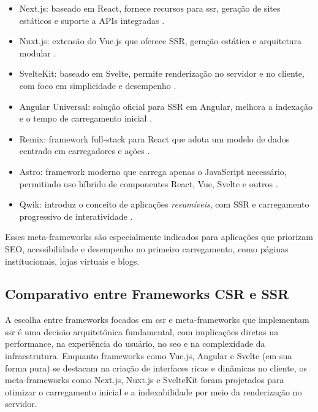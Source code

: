 \begin{itemize}
    \item Next.js: baseado em React, fornece recursos para \acrshort{ssr}, geração de sites estáticos e suporte a APIs integradas \cite{nextjs2024}.
    
    \item Nuxt.js: extensão do Vue.js que oferece SSR, geração estática e arquitetura modular \cite{nuxtjs2024}.
    
    \item SvelteKit: baseado em Svelte, permite renderização no servidor e no cliente, com foco em simplicidade e desempenho \cite{sveltekit2024}.
    
    \item Angular Universal: solução oficial para SSR em Angular, melhora a indexação e o tempo de carregamento inicial \cite{angularuniversal2024}.
    
    \item Remix: framework full-stack para React que adota um modelo de dados centrado em carregadores e ações \cite{remix2024}.
    
    \item Astro: framework moderno que carrega apenas o JavaScript necessário, permitindo uso híbrido de componentes React, Vue, Svelte e outros \cite{astro2024}.
    
    \item Qwik: introduz o conceito de aplicações \textit{resumíveis}, com SSR e carregamento progressivo de interatividade \cite{qwik2024}.
\end{itemize}

Esses meta-frameworks são especialmente indicados para aplicações que priorizam SEO, acessibilidade e desempenho no primeiro carregamento, como páginas institucionais, lojas virtuais e blogs.

\subsection{Comparativo entre Frameworks CSR e SSR}
\label{subsec:comparativo-frameworks}

A escolha entre frameworks focados em \acrshort{csr} e meta-frameworks que implementam \acrshort{ssr} é uma decisão arquitetônica fundamental, com implicações diretas na performance, na experiência do usuário, no \acrshort{seo} e na complexidade da infraestrutura. Enquanto frameworks como Vue.js, Angular e Svelte (em sua forma pura) se destacam na criação de interfaces ricas e dinâmicas no cliente, os meta-frameworks como Next.js, Nuxt.js e SvelteKit foram projetados para otimizar o carregamento inicial e a indexabilidade por meio da renderização no servidor.

